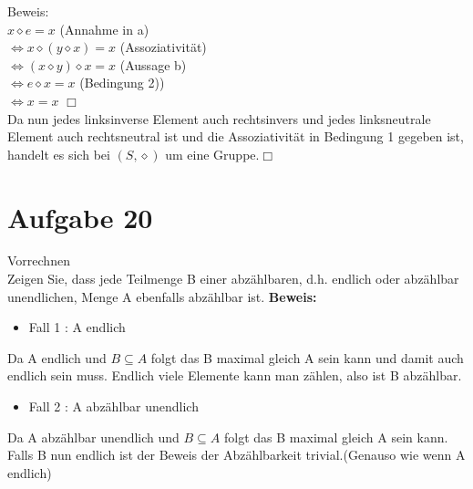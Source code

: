 \documentclass[paper = a4, ngerman]{scrartcl}
\begin{document}
Beweis:\\
$x \diamond e = x$ \hspace{10mm} (Annahme in a)\\
$\Leftrightarrow x \diamond (y \diamond x ) = x$ \hspace{10mm} (Assoziativität)\\ 
$\Leftrightarrow (x \diamond y) \diamond x  = x$ \hspace{10mm} (Aussage b)\\ 
$\Leftrightarrow e \diamond x  = x$ \hspace{10mm} (Bedingung 2))\\ 
$\Leftrightarrow x  = x$ \hfill$\Box$\\

Da nun jedes linksinverse Element auch rechtsinvers und jedes linksneutrale Element auch rechtsneutral ist und die Assoziativität in Bedingung 1 gegeben ist, handelt es sich bei $(S, \diamond)$ um eine Gruppe.\hfill$\Box$\\


	
	
\section*{Aufgabe 20}
Vorrechnen\\
Zeigen Sie, dass jede Teilmenge B einer abzählbaren, d.h. endlich oder abzählbar unendlichen, Menge A ebenfalls abzählbar ist.
\textbf{Beweis:}
\begin{itemize}
	\item Fall 1 : A endlich
\end{itemize}
Da A endlich und $B \subseteq A$  folgt das B maximal gleich A sein kann und damit auch endlich sein muss. Endlich viele Elemente kann man zählen, also ist B abzählbar.
\begin{itemize}
	\item Fall 2 : A abzählbar unendlich
\end{itemize}
Da A abzählbar unendlich und $B \subseteq A$  folgt das B maximal gleich A sein kann.\\
Falls B nun endlich ist der Beweis der Abzählbarkeit trivial.(Genauso wie wenn A endlich)\\
\end{document}
